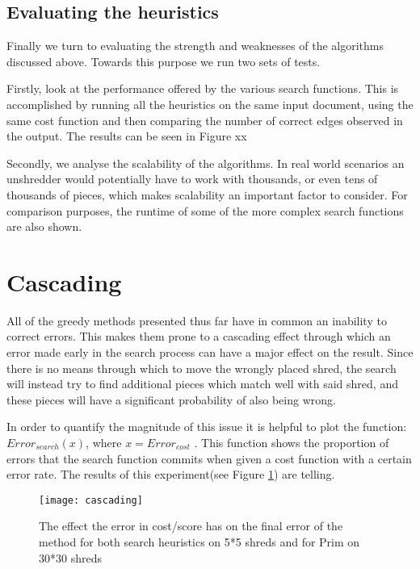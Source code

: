 \subsection{Evaluating the heuristics}
Finally we turn to evaluating the strength and weaknesses of the algorithms discussed above. Towards this purpose we run two sets of tests. 

Firstly, look at the performance offered by the various search functions. This is accomplished by running all the heuristics on the same input document, using the same cost function and then comparing the number of correct edges observed in the output. The results can be seen in Figure xx

Secondly, we analyse the scalability of the algorithms. In real world scenarios an unshredder would potentially have to work with thousands, or even tens of thousands of pieces, which makes scalability an important factor to consider. For comparison purposes, the runtime of some of the more complex search functions are also shown. 

\section{Cascading}
All of the greedy methods presented thus far have in common an inability to correct errors. This makes them prone to a cascading effect through which an error made early in the search process can have a major effect on the result. Since there is no means through which to move the wrongly placed shred, the search will instead try to find additional pieces which match well with said shred, and these pieces will have a significant probability of also being wrong. 

In order to quantify the magnitude of this issue it is helpful to plot the function: $Error_{search}(x)$, where $x = Error_{cost}$ . This function shows the proportion of errors that the search function commits when given a cost function with a certain error rate. The results of this experiment(see Figure \ref{fig:cascading}) are telling. 
\begin{figure}[h]
  \centering
  \texttt{[image: cascading]}
  \caption{The effect the error in cost/score has on the final error of the method for both search heuristics on 5*5 shreds and for Prim on 30*30 shreds }
  \label{fig:cascading}
\end{figure}

